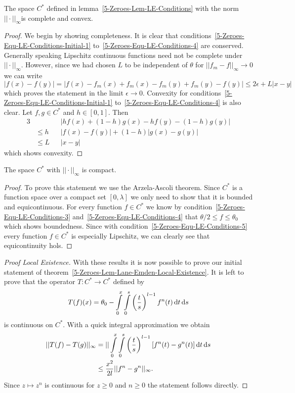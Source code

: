 \begin{lemma}
	The space $C^*$ defined in lemma~\ref{5-Zeroes-Lem-LE-Conditions} with the norm $||\cdot||_\infty$is complete and convex.
	\label{5-Zeroes-Lem-LE-Convex-Complete}
\end{lemma}
\begin{proof}
	We begin by showing completeness.
	It is clear that conditions~\eqref{5-Zeroes-Equ-LE-Conditions-Initial-1} to~\eqref{5-Zeroes-Equ-LE-Conditions-4} are conserved.
	Generally speaking Lipschitz continuous functions need not be complete under $||\cdot||_\infty$.
	However, since we had chosen $L$ to be independent of $\theta$ for $||f_m-f||_\infty\rightarrow0$ we can write
	\[
		|f(x)-f(y)|=|f(x)-f_m(x)+f_m(x)-f_m(y)+f_m(y)-f(y)|\leq 2\epsilon+L|x-y|
	\]
	which proves the statement in the limit $\epsilon\rightarrow0$.
	Convexity for conditions~\eqref{5-Zeroes-Equ-LE-Conditions-Initial-1} to~\eqref{5-Zeroes-Equ-LE-Conditions-4} is also clear.
	Let $f,g\in C^*$ and $h\in[0,1]$.
	Then
	\begin{alignat}{3}
		&&&|hf(x)+(1-h)g(x)-hf(y)-(1-h)g(y)|\\
		&\leq h&&|f(x)-f(y)|+ (1-h)|g(x)-g(y)|\\
		&\leq L&&|x-y|
	\end{alignat}
	which shows convexity.
\end{proof}\noindent
\begin{lemma}
	The space $C^*$ with $||\cdot||_\infty$ is compact.
	\label{5-Zeroes-Lem-LE-Compact}
\end{lemma}
\begin{proof}
	To prove this statement we use the Arzela-Ascoli theorem.
	Since $C^*$ is a function space over a compact set $[0,\lambda]$ we only need to show that it is bounded and equicontinuous.
	For every function $f\in C^*$ we know by condition~\eqref{5-Zeroes-Equ-LE-Conditions-3} and~\eqref{5-Zeroes-Equ-LE-Conditions-4} that $\theta/2\leq f\leq\theta_0$ which shows boundedness.
	Since with condition~\eqref{5-Zeroes-Equ-LE-Conditions-5} every function $f\in C^*$ is especially Lipschitz, we can clearly see that equicontinuity hols.
\end{proof}
\begin{proof}[Proof  Local Existence]
	With these results it is now possible to prove our initial statement of theorem~\ref{5-Zeroes-Lem-Lane-Emden-Local-Existence}.
	It is left to prove that the operator $T:C^*\rightarrow C^*$ defined by
	\begin{equation}
		T(f)(x) = \theta_0 - \int\limits_0^x\int\limits_0^s \left(\frac{t}{s}\right)^{l-1}f^n(t)\mathop{}\!\mathrm{d} t\mathop{}\!\mathrm{d} s
		\label{eq:5-Zeroes-LE-Definition-Operator-On-C-Star}
	\end{equation}
	is continuous on $C^*$.
	With a quick integral approximation we obtain
	\begin{align}
		||T(f)-T(g)||_{\infty} &= ||\int\limits_0^x\int\limits_0^s \left(\frac{t}{s}\right)^{l-1}\left[f^n(t)-g^n(t)\right]\mathop{}\!\mathrm{d} t\mathop{}\!\mathrm{d} s\\
		&\leq \frac{x^2}{2l}||f^n-g^n||_{\infty}.
	\end{align}
	Since $z\mapsto z^n$ is continuous for $z\geq0$ and $n\geq0$ the statement follows directly.
\end{proof}\noindent
